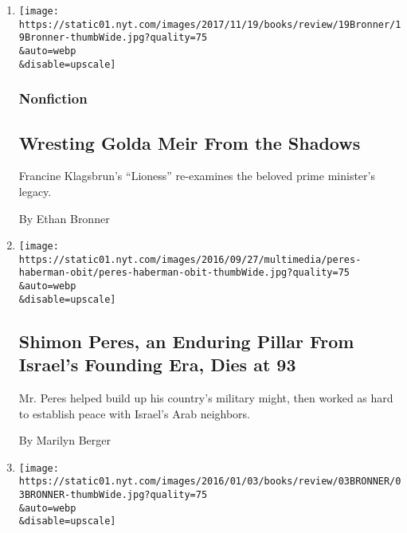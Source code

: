 \begin{enumerate}
\def\labelenumi{\arabic{enumi}.}
\item
  \href{/2017/11/17/books/review/francine-klagsbrun-lioness-golda-meir-israel-biography.html}{}

  \texttt{[image: https://static01.nyt.com/images/2017/11/19/books/review/19Bronner/19Bronner-thumbWide.jpg?quality=75\\\&auto=webp\\\&disable=upscale]}

  \hypertarget{nonfiction}{%
  \subsubsection{Nonfiction}\label{nonfiction}}

  \hypertarget{wresting-golda-meir-from-the-shadows}{%
  \subsection{Wresting Golda Meir From the
  Shadows}\label{wresting-golda-meir-from-the-shadows}}

  Francine Klagsbrun's ``Lioness'' re-examines the beloved prime
  minister's legacy.

  By Ethan Bronner
\item
  \href{/2016/09/28/world/middleeast/shimon-peres-dies-israel.html}{}

  \texttt{[image: https://static01.nyt.com/images/2016/09/27/multimedia/peres-haberman-obit/peres-haberman-obit-thumbWide.jpg?quality=75\\\&auto=webp\\\&disable=upscale]}

  \hypertarget{shimon-peres-an-enduring-pillar-from-israels-founding-era-dies-at-93}{%
  \subsection{Shimon Peres, an Enduring Pillar From Israel's Founding
  Era, Dies at
  93}\label{shimon-peres-an-enduring-pillar-from-israels-founding-era-dies-at-93}}

  Mr. Peres helped build up his country's military might, then worked as
  hard to establish peace with Israel's Arab neighbors.

  By Marilyn Berger
\item
  \href{/2016/01/03/books/review/abba-eban-a-biography-by-asaf-siniver.html}{}

  \texttt{[image: https://static01.nyt.com/images/2016/01/03/books/review/03BRONNER/03BRONNER-thumbWide.jpg?quality=75\\\&auto=webp\\\&disable=upscale]}


\end{enumerate}
